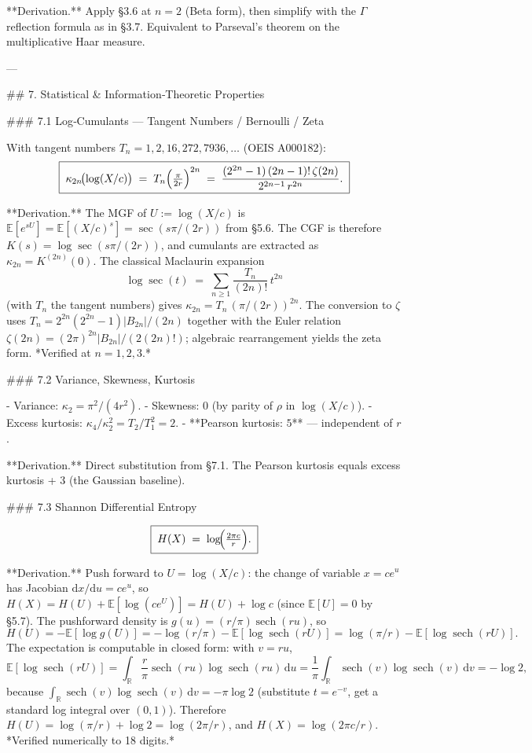 **Derivation.** Apply §3.6 at $n=2$ (Beta form), then simplify with the $\Gamma$ reflection formula as in §3.7. Equivalent to Parseval's theorem on the multiplicative Haar measure.

---

## 7. Statistical & Information‑Theoretic Properties

### 7.1 Log‑Cumulants — Tangent Numbers / Bernoulli / Zeta

With tangent numbers $T_{n} = 1,2,16,272,7936,\ldots$ (OEIS A000182):
$$
\boxed{\;\kappa_{2n}\!\bigl(\log(X/c)\bigr) \;=\; T_{n}\Bigl(\tfrac{\pi}{2r}\Bigr)^{2n} \;=\; \frac{(2^{2n}-1)\,(2n-1)!\,\zeta(2n)}{2^{2n-1}\,r^{2n}}.\;}
$$

**Derivation.** The MGF of $U := \log(X/c)$ is $\mathbb E[e^{sU}] = \mathbb E[(X/c)^{s}] = \sec(s\pi/(2r))$ from §5.6. The CGF is therefore $K(s) = \log\sec(s\pi/(2r))$, and cumulants are extracted as $\kappa_{2n} = K^{(2n)}(0)$. The classical Maclaurin expansion
$$
\log\sec(t) \;=\; \sum_{n\ge 1}\frac{T_{n}}{(2n)!}\,t^{2n}
$$
(with $T_{n}$ the tangent numbers) gives $\kappa_{2n} = T_{n}\,(\pi/(2r))^{2n}$. The conversion to $\zeta$ uses $T_{n} = 2^{2n}(2^{2n}-1)|B_{2n}|/(2n)$ together with the Euler relation $\zeta(2n) = (2\pi)^{2n}|B_{2n}|/(2(2n)!)$; algebraic rearrangement yields the zeta form. *Verified at $n=1,2,3$.*

### 7.2 Variance, Skewness, Kurtosis

- Variance: $\kappa_{2} = \pi^{2}/(4r^{2})$.
- Skewness: $0$ (by parity of $\rho$ in $\log(X/c)$).
- Excess kurtosis: $\kappa_{4}/\kappa_{2}^{2} = T_{2}/T_{1}^{2} = 2$.
- **Pearson kurtosis: $5$** — independent of $r$.

**Derivation.** Direct substitution from §7.1. The Pearson kurtosis equals excess kurtosis + 3 (the Gaussian baseline).

### 7.3 Shannon Differential Entropy

$$
\boxed{\;H(X) \;=\; \log\!\Bigl(\tfrac{2\pi c}{r}\Bigr).\;}
$$

**Derivation.** Push forward to $U = \log(X/c)$: the change of variable $x = ce^{u}$ has Jacobian $\mathrm dx/\mathrm du = ce^{u}$, so $H(X) = H(U) + \mathbb E[\log(ce^{U})] = H(U) + \log c$ (since $\mathbb E[U]=0$ by §5.7). The pushforward density is $g(u) = (r/\pi)\operatorname{sech}(ru)$, so
$$
H(U) = -\mathbb E[\log g(U)] = -\log(r/\pi) - \mathbb E[\log\operatorname{sech}(rU)] = \log(\pi/r) - \mathbb E[\log\operatorname{sech}(rU)].
$$
The expectation is computable in closed form: with $v = ru$,
$$
\mathbb E[\log\operatorname{sech}(rU)] = \int_{\mathbb R}\frac{r}{\pi}\operatorname{sech}(ru)\log\operatorname{sech}(ru)\,\mathrm du = \frac{1}{\pi}\int_{\mathbb R}\operatorname{sech}(v)\log\operatorname{sech}(v)\,\mathrm dv = -\log 2,
$$
because $\int_{\mathbb R}\operatorname{sech}(v)\log\operatorname{sech}(v)\,\mathrm dv = -\pi\log 2$ (substitute $t = e^{-v}$, get a standard log integral over $(0,1)$). Therefore $H(U) = \log(\pi/r) + \log 2 = \log(2\pi/r)$, and $H(X) = \log(2\pi c/r)$. *Verified numerically to 18 digits.*

